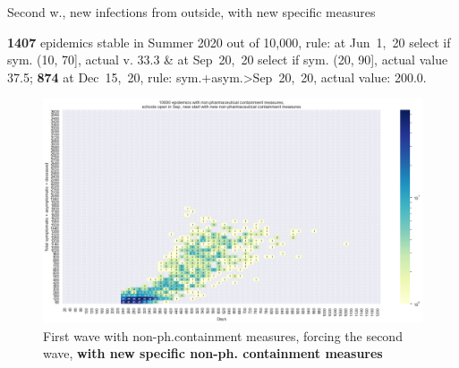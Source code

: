 \documentclass[8pt]{beamer}
\begin{document}
\begin{frame}{Second w., new infections from outside, with new specific measures}


\textbf{1407} {\tiny epidemics stable in Summer 2020 out of 10,000, rule: at Jun~1,~20 select if sym. (10, 70], actual v. 33.3 \& at Sep~20,~20 select if sym. (20, 90], actual value 37.5;} \textbf{874} {\tiny at Dec~15,~20, rule: sym.+asym.>Sep~20,~20, actual value: 200.0.}

\begin{figure}[H]
\center
\includegraphics[scale=0.17]{10kForceWave2Contr2.png}
\caption{First wave with non-ph.containment measures, forcing the second wave, \textbf{with new specific non-ph. containment measures}}
\label{selForceWave2Contr2}
\end{figure}



\end{frame}
\end{document}
